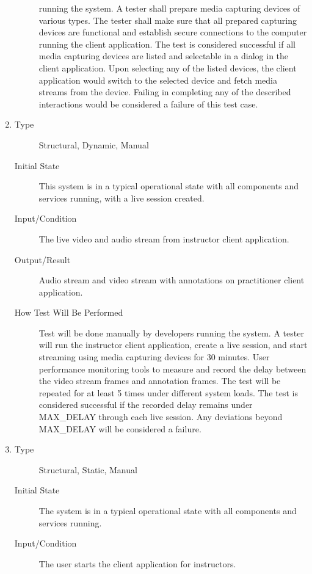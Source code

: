 \documentclass[12pt, titlepage]{article}
\begin{document}
\begin{enumerate}[NFR-T1]
\begin{description}
    running the system. A tester shall prepare media capturing devices of
    various types. The tester shall make sure that all prepared capturing
    devices are functional and establish secure connections to the computer
    running the client application. The test is considered successful if all
    media capturing devices are listed and selectable in a dialog in the client
    application. Upon selecting any of the listed devices, the client
    application would switch to the selected device and fetch media streams from
    the device. Failing in completing any of the described interactions would be
    considered a failure of this test case.
  \end{description}
\item \label{NFRT14}
  \begin{description}
  \item[Type] Structural, Dynamic, Manual
  \item[Initial State] This system is in a typical operational state with all
    components and services running, with a live session created.
  \item[Input/Condition] The live video and audio stream from instructor client
    application.
  \item[Output/Result] Audio stream and video stream with annotations on
    practitioner client application.
  \item[How Test Will Be Performed] Test will be done manually by developers
    running the system. A tester will run the instructor client application,
    create a live session, and start streaming using media capturing devices for
    30 minutes. User performance monitoring tools to measure and record the
    delay between the video stream frames and annotation frames. The test will
    be repeated for at least 5 times under different system loads. The test is
    considered successful if the recorded delay remains under MAX\_DELAY
    through each live session. Any deviations beyond MAX\_DELAY will be
    considered a failure.
  \end{description}
\item \label{NFRT15}
  \begin{description}
  \item[Type] Structural, Static, Manual
  \item[Initial State] The system is in a typical operational state with all
    components and services running.
  \item[Input/Condition] The user starts the client application for instructors.

\end{description}
\end{enumerate}
\end{document}
